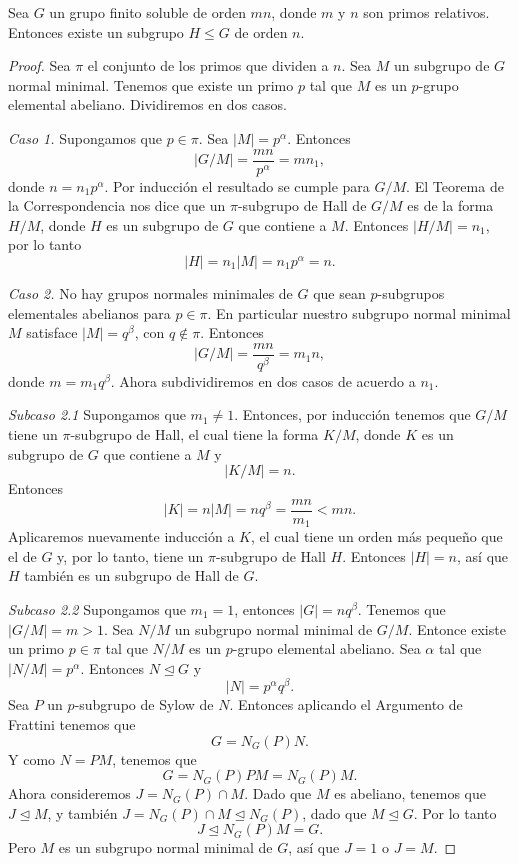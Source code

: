\begin{teorema}[Hall]
    Sea $G$ un grupo finito soluble de orden $mn$, donde $m$ y $n$ son primos relativos. Entonces existe un subgrupo $H\leq G$ de orden $n$.
\end{teorema}

\begin{proof}
    Sea $\pi$ el conjunto de los primos que dividen a $n$. Sea $M$ un subgrupo de $G$ normal minimal. Tenemos que existe un primo $p$ tal que $M$ es un $p$-grupo elemental abeliano. Dividiremos en dos casos.

    \textit{Caso 1. } Supongamos que $p\in \pi$.
	Sea $\vert M\vert = p^{\alpha}$. Entonces
	\[\vert G/M\vert = \frac{mn}{p^{\alpha}} = mn_{1},\]
	donde $n = n_1p^{\alpha}$. Por inducci\'on el resultado se cumple para $G/M$. El Teorema de la Correspondencia nos dice que un $\pi$-subgrupo de Hall de $G/M$ es de la forma $H/M$, donde $H$ es un subgrupo de $G$ que contiene a $M$. Entonces $\vert H/M \vert = n_1$, por lo tanto
	\[\vert H\vert = n_1\vert M\vert = n_1p^{\alpha} = n.\]

    \textit{Caso 2.} No hay grupos normales minimales de $G$ que sean $p$-subgrupos elementales abelianos para $p\in \pi$.
	En particular nuestro subgrupo normal minimal $M$ satisface $\vert M\vert = q^{\beta}$, con $q\not\in \pi$. Entonces
	\[\vert G/M\vert = \frac{mn}{q^{\beta}} = m_1n,\]
	donde $m = m_1q^{\beta}$. Ahora subdividiremos en dos casos de acuerdo a $n_1$.

	\textit{Subcaso 2.1} Supongamos que $m_1 \neq 1$.
		Entonces, por inducci\'on tenemos que $G/M$ tiene un $\pi$-subgrupo de Hall, el cual tiene la forma $K/M$, donde $K$ es un subgrupo de $G$ que contiene a $M$ y
		\[\vert K/M\vert = n.\]
		Entonces
		\[\vert K\vert = n\vert M\vert = nq^{\beta} = \frac{mn}{m_1} < mn.\]
		Aplicaremos nuevamente inducci\'on a $K$, el cual tiene un orden m\'as peque\~no que el de $G$ y, por lo tanto, tiene un $\pi$-subgrupo de Hall $H$. Entonces $\vert H\vert = n$, as\'i que $H$ tambi\'en es un subgrupo de Hall de $G$.

	\textit{Subcaso 2.2} Supongamos que $m_1 = 1$, entonces $\vert G\vert = nq^{\beta}$.
		Tenemos que $\vert G/M\vert = m>1$. Sea $N/M$ un subgrupo normal minimal de $G/M$. Entonce existe un primo $p\in \pi$ tal que $N/M$ es un $p$-grupo elemental abeliano. Sea $\alpha$ tal que $\vert N/M\vert = p^{\alpha}$. Entonces $N\trianglelefteq G$ y 
		\[\vert N\vert = p^{\alpha}q^{\beta}.\]
		Sea $P$ un $p$-subgrupo de Sylow de $N$. Entonces aplicando el Argumento de Frattini tenemos que 
		\[G = N_G(P)N.\]
		Y como $N = PM$, tenemos que
		\[G = N_G(P)PM = N_G(P)M.\]
		Ahora consideremos $J = N_G(P)\cap M$. Dado que $M$ es abeliano, tenemos que $J\trianglelefteq M$, y tambi\'en $J = N_G(P)\cap M \trianglelefteq N_G(P)$, dado que $M\trianglelefteq G$. Por lo tanto
		\[J \trianglelefteq N_G(P)M = G.\]
		Pero $M$ es un subgrupo normal minimal de $G$, as\'i que $J=1$ o $J=M$.
		

\end{proof}
